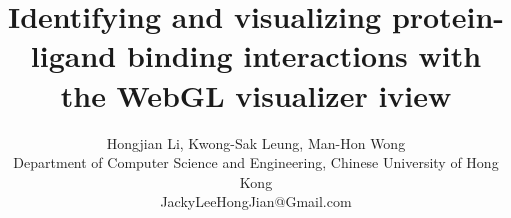 \documentclass{article}
\begin{document}
\date{}

\newcommand{\mytitle}{Identifying and visualizing protein-ligand binding interactions with the WebGL visualizer iview}
\title{\Large\bf \mytitle}

\author{Hongjian Li, Kwong-Sak Leung, Man-Hon Wong\\
       Department of Computer Science and Engineering, Chinese University of Hong Kong\\
       JackyLeeHongJian@Gmail.com}

\maketitle
\pagestyle{empty}
\thispagestyle{empty}
\end{document}
